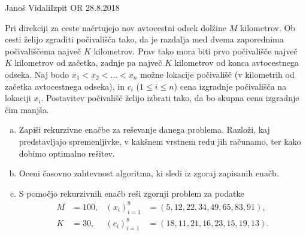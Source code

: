 \begin{naloga}{Janoš Vidali}{Izpit OR 28.8.2018}
\begin{vprasanje}
Pri direkciji za ceste načrtujejo nov avtocestni odsek dolžine $M$ kilometrov.
Ob cesti želijo zgraditi počivališča tako,
da je razdalja med dvema zaporednima počivališčema največ $K$ kilometrov.
Prav tako mora biti prvo počivališče največ $K$ kilometrov od začetka,
zadnje pa največ $K$ kilometrov od konca avtocestnega odseka.
Naj bodo $x_1 < x_2 < \dots < x_n$ možne lokacije počivališč
(v kilometrih od začetka avtocestnega odseka),
in $c_i$ ($1 \le i \le n$) cena izgradnje počivališča na lokaciji $x_i$.
Postavitev počivališč želijo izbrati tako,
da bo skupna cena izgradnje čim manjša.

\begin{enumerate}[(a)]
\item Zapiši rekurzivne enačbe za reševanje danega problema.
Razloži, kaj predstavljajo spremenljivke,
v kakšnem vrstnem redu jih računamo, ter kako dobimo optimalno rešitev.

\item Oceni časovno zahtevnost algoritma, ki sledi iz zgoraj zapisanih enačb.

\item S pomočjo rekurzivnih enačb reši zgornji problem za podatke
\begin{align*}
M &= 100, & (x_i)_{i=1}^8 &= ( 5, 12, 22, 34, 49, 65, 83, 91), \\
K &= 30,  & (c_i)_{i=1}^8 &= (18, 11, 21, 16, 23, 15, 19, 13).
\end{align*}
\end{enumerate}
\end{vprasanje}
\begin{odgovor}
\end{odgovor}
\end{naloga}
